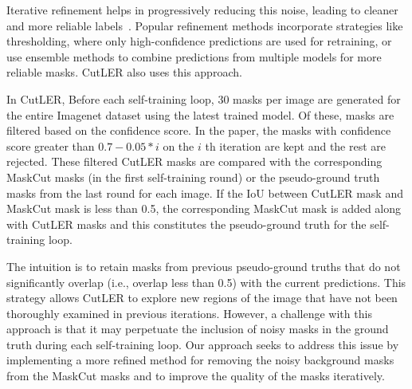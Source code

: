Iterative refinement helps in progressively reducing this noise, leading to cleaner and more reliable labels~\cite{xie2020selftrainingnoisystudentimproves}. Popular refinement methods incorporate strategies like thresholding, where only high-confidence predictions are used for retraining, or use ensemble methods to combine predictions from multiple models for more reliable masks. CutLER also uses this approach.

In CutLER, Before each self-training loop, 30 masks per image are generated for the entire Imagenet dataset using the latest trained model. Of these, masks are filtered based on the confidence score. In the paper, the masks with confidence score greater than \(0.7 - 0.05 * i\) on the \(i\) th iteration are kept and the rest are rejected. These filtered CutLER masks are compared with the corresponding MaskCut masks (in the first self-training round) or the pseudo-ground truth masks from the last round for each image. If the IoU between CutLER mask and MaskCut mask is less than 0.5, the corresponding MaskCut mask is added along with CutLER masks and this constitutes the pseudo-ground truth for the self-training loop.

The intuition is to retain masks from previous pseudo-ground truths that do not significantly overlap (i.e., overlap less than 0.5) with the current predictions. This strategy allows CutLER to explore new regions of the image that have not been thoroughly examined in previous iterations. However, a challenge with this approach is that it may perpetuate the inclusion of noisy masks in the ground truth during each self-training loop. Our approach seeks to address this issue by implementing a more refined method for removing the noisy background masks from the MaskCut masks and to improve the quality of the masks iteratively.